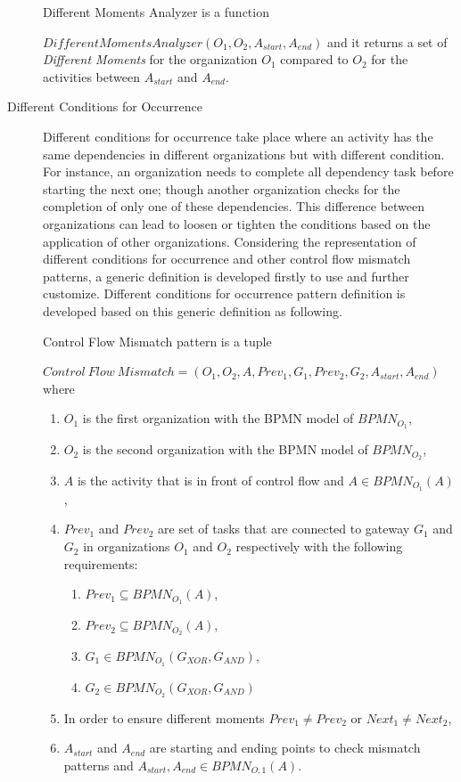 \begin{description}
		\theoremstyle{definition}
		\begin{definition}
		Different Moments Analyzer is a function 

		$DifferentMomentsAnalyzer(O_{1}, O_{2}, A_{start}, A_{end})$ and it returns a set of \textit{Different Moments} for the organization $O_{1}$ compared to $O_{2}$ for the activities between $A_{start}$ and $A_{end}$.
		\end{definition}

	\item[Different Conditions for Occurrence] Different conditions for occurrence take place where an activity has the same dependencies in different organizations but with different condition. For instance, an organization needs to complete all dependency task before starting the next one; though another organization checks for the completion of only one of these dependencies. This difference between organizations can lead to loosen or tighten the conditions based on the application of other organizations. Considering the representation of different conditions for occurrence and other control flow mismatch patterns, a generic definition is developed firstly to use and further customize. Different conditions for occurrence pattern definition is developed based on this generic definition as following.
		\theoremstyle{definition}
		\begin{definition}
		Control Flow Mismatch pattern is a tuple 

		${Control\ Flow\ Mismatch} = (O_{1}, O_{2}, A, Prev_{1}, G_{1}, Prev_{2}, G_{2}, A_{start}, A_{end}) $ where 
		\begin{enumerate}
		  \item $O_{1}$ is the first organization with the BPMN model of $BPMN_{{O}_{1}}$,
		  \item $O_{2}$ is the second organization with the BPMN model of $BPMN_{{O}_{2}}$,
		  \item $A$ is the activity that is in front of control flow and $A \in BPMN_{{O}_{1}}(A)$,
		  \item $Prev_{1}$ and $Prev_{2}$ are set of tasks that are connected to gateway $G_{1}$ and $G_{2}$ in organizations $O_{1}$ and $O_{2}$ respectively with the following requirements:
			  \begin{enumerate}
				  \item $Prev_{1} \subseteq BPMN_{{O}_{1}}(A)$,
				  \item $Prev_{2} \subseteq BPMN_{{O}_{2}}(A)$,
				  \item $G_{1} \in BPMN_{{O}_{1}}(G_{XOR}, G_{AND})$,
	  			  \item $G_{2} \in BPMN_{{O}_{2}}(G_{XOR}, G_{AND})$
			  \end {enumerate}
  		  \item In order to ensure different moments $Prev_{1} \neq Prev_{2}$ or $Next_{1} \neq Next_{2}$,
 		  \item $A_{start}$ and $A_{end}$ are starting and ending points to check mismatch patterns and $A_{start}, A_{end} \in BPMN_{O,1}(A)$.
		\end{enumerate}
		\end{definition}


\end{description}
